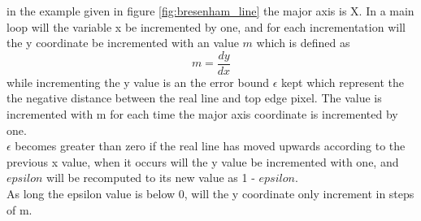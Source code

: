\documentclass[10pt,a4paper]{article}
\begin{document}
in the example given in figure \ref{fig:bresenham_line} the major axis is X. In a main loop will the variable x be incremented by one, and for each incrementation will the y coordinate be incremented with an value $m$ which is defined as $$m = \frac{dy}{dx}$$ while incrementing the y value is an the error bound $\epsilon$  kept which represent the the negative distance between the real line and top edge pixel.  The value is incremented with m for each time the major axis coordinate is incremented by one. \\
$\epsilon$ becomes greater than zero  if the real line has moved upwards according to the previous x value, when it occurs will the y value  be incremented with one, and $epsilon$ will be recomputed to its new value as 1 - $epsilon$. \\

As long the epsilon value is below 0, will the y coordinate only increment in steps of m. 

 



\end{document}
